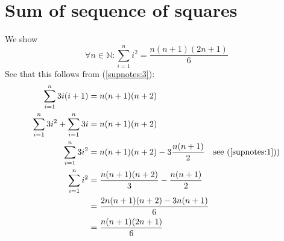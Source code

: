 \documentclass{report}
\begin{document}
\section{Sum of sequence of squares}
\label{supnotes:4}
We show
\begin{equation*}
\boxed{\forall n\in\mathbb{N}:
\sum^n_{i=1}i^2=\frac{n(n+1)(2n+1)}{6}}
\end{equation*}
See that this follows from (\ref{supnotes:3}):
\begin{align*}
\sum^n_{i=1}3i(i+1)&=n(n+1)(n+2)\\
\sum^n_{i=1}3i^2+\sum^n_{i=1}3i&=n(n+1)(n+2)\\
\sum^n_{i=1}3i^2&=n(n+1)(n+2)-3\frac{n(n+1)}{2}\quad\text{see (\ref{supnotes:1}))}\\
\sum^n_{i=1}i^2&=\frac{n(n+1)(n+2)}{3}-\frac{n(n+1)}{2}\\
&=\frac{2n(n+1)(n+2)-3n(n+1)}{6}\\
&=\frac{n(n+1)(2n+1)}{6}
\end{align*}
\end{document}
